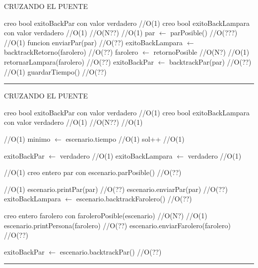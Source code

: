 \begin{algorithm}[H]
\caption{CRUZANDO EL PUENTE}
\begin{algorithmic}[1]
\state creo bool exitoBackPar con valor verdadero \hfill //O(1)
\state creo bool exitoBackLampara con valor verdadero \hfill //O(1)
 \hfill //O(N??)
 \hfill //O(1)
\state par $\gets$ parPosible() \hfill //O(???)
 \hfill //O(1)
\state funcion enviarPar(par) \hfill //O(??)
\Else
\state exitoBackLampara $\gets$ backtrackRetorno(farolero) \hfill //O(??)
\endif
\Else
\state farolero $\gets$ retornoPosible \hfill //O(N?)
 \hfill //O(1)
\state retornarLampara(farolero) \hfill //O(??)
\Else
\state exitoBackPar $\gets$ backtrackPar(par) \hfill //O(??)
\endif
\endif
{} \hfill //O(1)
\state guardarTiempo() \hfill //O(??)
\endif
\endwhile
\EndFunction 
\end{algorithmic}
\hrule
{}
\end{algorithm}


\begin{algorithm}[H]
\caption{CRUZANDO EL PUENTE}
\begin{algorithmic}[1]
\state creo bool exitoBackPar con valor verdadero \hfill //O(1)
\state creo bool exitoBackLampara con valor verdadero \hfill //O(1)
 \hfill //O(N??)
 \hfill //O(1)

 \hfill //O(1)
\state minimo $\gets$ escenario.tiempo \hfill //O(1)
\endif
\state sol++  \hfill //O(1)
\endif

\state exitoBackPar $\gets$ verdadero \hfill //O(1)
\state exitoBackLampara $\gets$ verdadero \hfill //O(1)

 \hfill //O(1)
\state creo entero par con escenario.parPosible() \hfill //O(??)

 \hfill //O(1)
\state escenario.printPar(par) \hfill //O(??)
\state escenario.enviarPar(par) \hfill //O(??)
\Else
\state exitoBackLampara $\gets$ escenario.backtrackFarolero() \hfill //O(??)
\endif


\Else
\state creo entero farolero con faroleroPosible(escenario) \hfill //O(N?)
 \hfill //O(1)
\state escenario.printPersona(farolero) \hfill //O(??)
\state escenario.enviarFarolero(farolero) \hfill //O(??)

\Else
\state exitoBackPar $\gets$ escenario.backtrackPar() \hfill //O(??)
\endif
\endif
\endwhile
\EndFunction 
\end{algorithmic}
\hrule
{}
\end{algorithm}

